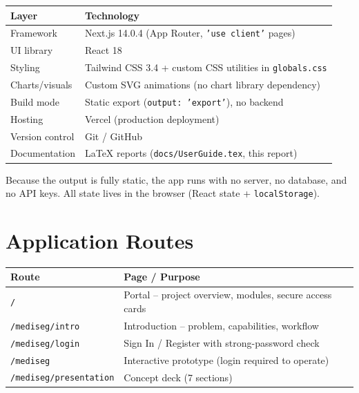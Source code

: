 \documentclass[11pt, a4paper]{article}
\begin{document}
\begin{tabularx}{\textwidth}{lX}
  \toprule
  \textbf{Layer} & \textbf{Technology}\\
  \midrule
  Framework & Next.js 14.0.4 (App Router, \texttt{'use client'} pages)\\
  UI library & React 18\\
  Styling & Tailwind CSS 3.4 + custom CSS utilities in \texttt{globals.css}\\
  Charts/visuals & Custom SVG animations (no chart library dependency)\\
  Build mode & Static export (\texttt{output: 'export'}), no backend\\
  Hosting & Vercel (production deployment)\\
  Version control & Git / GitHub\\
  Documentation & \LaTeX{} reports (\texttt{docs/UserGuide.tex}, this report)\\
  \bottomrule
\end{tabularx}

\begin{tipbox}
Because the output is fully static, the app runs with no server, no database,
and no API keys. All state lives in the browser (React state +
\texttt{localStorage}).
\end{tipbox}

\section{Application Routes}

\begin{tabularx}{\textwidth}{lX}
  \toprule
  \textbf{Route} & \textbf{Page / Purpose}\\
  \midrule
  \texttt{/} & Portal -- project overview, modules, secure access cards\\
  \texttt{/mediseg/intro} & Introduction -- problem, capabilities, workflow\\
  \texttt{/mediseg/login} & Sign In / Register with strong-password check\\
  \texttt{/mediseg} & Interactive prototype (login required to operate)\\
  \texttt{/mediseg/presentation} & Concept deck (7 sections)\\
  \bottomrule
\end{tabularx}
\end{document}
